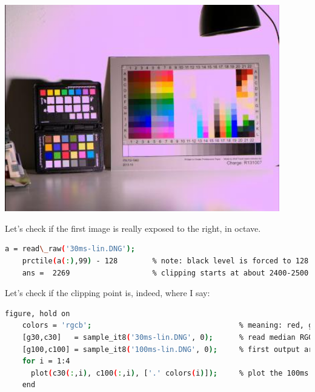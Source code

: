 \begin{center}
\includegraphics[height=9cm]{images/100ms-lin}
\end{center}

Let's check if the first image is really exposed to the right, in octave.  

\begin{lstlisting}[language=bash,morekeywords=$,keywordstyle=\bfseries,frame=none,xleftmargin=.25in,belowskip=2em, aboveskip=2em]
    a = read\_raw('30ms-lin.DNG');
    prctile(a(:),99) - 128        % note: black level is forced to 128 in raw2dng
    ans =  2269                   % clipping starts at about 2400-2500 above black
\end{lstlisting}

Let's check if the clipping point is, indeed, where I say: 

\begin{lstlisting}[language=bash,morekeywords=$,keywordstyle=\bfseries,frame=none,xleftmargin=.25in,belowskip=2em, aboveskip=2em]
    figure, hold on
    colors = 'rgcb';                                  % meaning: red, gren1, green2 (plotted as cyan), blue (raw data from Bayer channels)
    [g30,c30]   = sample_it8('30ms-lin.DNG', 0);      % read median RGGB swatch values from IT8 chart
    [g100,c100] = sample_it8('100ms-lin.DNG', 0);     % first output arg is grayscale, second is full color, each column is a Bayer channel
    for i = 1:4
      plot(c30(:,i), c100(:,i), ['.' colors(i)]);     % plot the 100ms image vs the 30ms one (extremely rough guess for response curve)
    end
\end{lstlisting}

